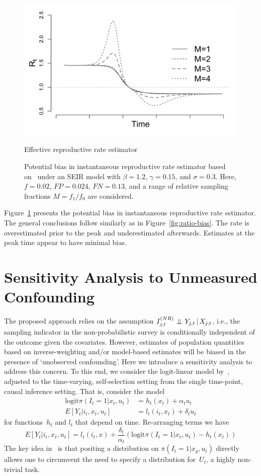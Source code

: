 \documentclass[11pt]{amsart}
\numberwithin{equation}{section}
\theoremstyle{plain}
\def\logit{\text{logit}}
\begin{document}
\begin{figure}
 \centering
  \includegraphics[width=.9\linewidth]{../figs/seir_cori_rt.png}
  \caption{Effective reproductive rate estimator}
 \caption{Potential bias in instantaneous reproductive rate estimator based on~\cite{Cori20113} under an SEIR model with $\beta = 1.2$, $\gamma = 0.15$, and $\sigma = 0.3$.  Here, $f = 0.02$, $FP = 0.024$, $FN = 0.13$, and a range of relative sampling fractions $M = f_1/f_0$ are considered.}
 \label{fig:cori-bias}
 \end{figure}


Figure~\ref{fig:cori-bias} presents the potential bias in instantaneous reproductive rate estimator.  The general conclusions follow similarly as in  Figure~\ref{fig:ratio-bias}. The rate is overestimated prior to the peak and underestimated afterwards.  Estimates at the peak time appear to have minimal bias.

\section{Sensitivity Analysis to Unmeasured Confounding}
\label{sec:sensitivity_confounders}

The proposed approach relies on the assumption $I_{j,t}^{(NR)} \indep Y_{j,t} \, | \, X_{j,t}$, i.e., the sampling indicator in the non-probabilistic survey is conditionally independent of the outcome given the covariates.  However, estimates of population quantities based on inverse-weighting and/or model-based estimates will be biased in the presence of `unobserved confounding'.  Here we introduce a sensitivity analysis to address this concern.  To this end, we consider the logit-linear model by~\cite{Imbens2003}, adjusted to the time-varying, self-selection setting from the single time-point, causal inference setting.  That is, consider the model
\begin{align*}
\logit \pi \left( I_{t} = 1  | x_{t}, u_{t} \right) &= h_t(x_t) + \alpha_t u_t \\
E[ Y_t | i_t, x_t, u_t] &= l_t(i_t, x_t) + \delta_t u_t
\end{align*}
for functions~$h_t$ and $l_t$ that depend on time. Re-arranging terms we have
$$
E[ Y_t | i_t, x_t, u_t ] = l_t(i_t,x)  + \frac{\delta_t}{\alpha_t} \left( \logit \pi \left( I_{t} = 1  | x_{t}, u_{t} \right) - h_t (x_t) \right)
$$
The key idea in~\cite{Imbens2003} is that positing a distribution on $\pi(I_t = 1 | x_y, u_t)$ directly allows one to circumvent the need to specify a distribution for~$U_t$, a highly non-trivial task.
\end{document}
